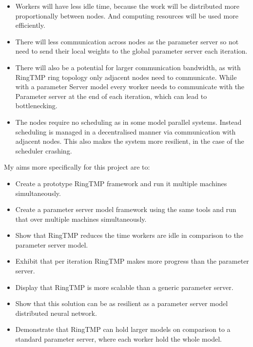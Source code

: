 \begin{itemize}
    \item Workers will have less idle time, because the work will be distributed
    more proportionally between nodes. And computing resources will be used more
    efficiently.
    \item There will less communication across nodes as the parameter server so
    not need to send their local weights to the global parameter server each
    iteration.
    \item There will also be a potential for larger communication bandwidth, as
    with RingTMP ring topology only adjacent nodes need to communicate. While
    with a parameter Server model every worker needs to communicate with the
    Parameter server at the end of each iteration, which can lead to
    bottlenecking.
    \item The nodes require no scheduling as in some model parallel systems.
    Instead scheduling is managed in a decentralised manner via communication
    with adjacent nodes. This also makes the system more resilient, in the case
    of the scheduler crashing.
\end{itemize}

My aims more specifically for this project are to:
\begin{itemize}
    \item Create a prototype RingTMP framework and run it multiple machines
    simultaneously.
    \item Create a parameter server model framework using the same tools and run
    that over multiple machines simultaneously.
    \item Show that RingTMP reduces the time workers are idle in comparison to
    the parameter server model.
    \item Exhibit that per iteration RingTMP makes more progress than the parameter
    server.
    \item Display that RingTMP is more scalable than a generic parameter server.
    \item Show that this solution can be as resilient as a parameter server
    model distributed neural network.
    \item Demonstrate that RingTMP can hold larger models on comparison to a
    standard parameter server, where each worker hold the whole model.
\end{itemize}


